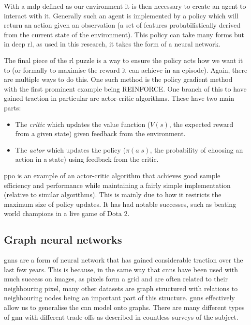 With a \ac{mdp} defined as our environment it is then necessary to create an agent to interact with it. Generally such an agent is implemented by a policy which will return an action given an observation (a set of features probabilistically derived from the current state of the environment). This policy can take many forms but in deep \ac{rl}, as used in this research, it takes the form of a neural network.

The final piece of the \ac{rl} puzzle is a way to ensure the policy acts how we want it to (or formally to maximise the reward it can achieve in an episode). Again, there are multiple ways to do this. One such method is the policy gradient method with the first prominent example being REINFORCE\cite{williams1992simple}. One branch of this to have gained traction in particular are actor-critic algorithms. These have two main parts:

\begin{itemize}
    \item The \emph{critic} which updates the value function ($V(s)$, the expected reward from a given state) given feedback from the environment.
    \item The \emph{actor} which updates the policy ($\pi(a|s)$, the probability of choosing an action in a state) using feedback from the critic.
\end{itemize}

\Acf{ppo}\cite{schulman2017proximal} is an example of an actor-critic algorithm that achieves good sample efficiency and performance while maintaining a fairly simple implementation (relative to similar algorithms). This is mainly due to how it restricts the maximum size of policy updates. It has had notable successes, such as beating world champions in a live game of Dota 2\cite{openai2019dota}.

\subsection{Graph neural networks}
\label{section:graph_neural_networks}

\Acfp{gnn}\cite{gori2005new,scarselli2008graph} are a form of neural network that has gained considerable 
traction over the last few years. This is because, in the same way that \acp{cnn} have been used with much success on images, as pixels form a grid and are often related to their neighbouring pixel, many other datasets are graph structured with relations to neighbouring nodes being an important part of this structure. \Acp{gnn} effectively allow us to generalise the \ac{cnn} model onto graphs. There are many different types of \ac{gnn} with different trade-offs as described in countless surveys of the subject\cite{zhou2018graph,Wu_2020}.


